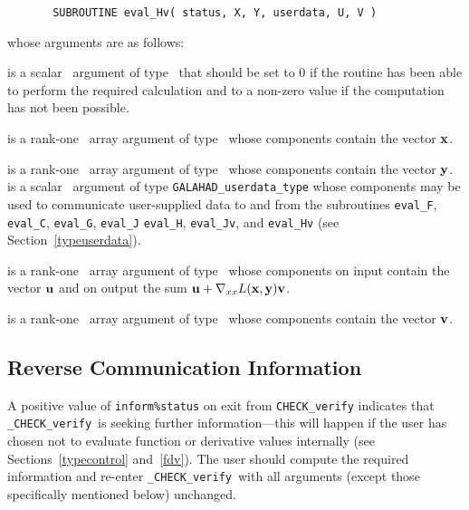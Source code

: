 \documentclass{galahad}
\newcommand{\packagename}{CHECK}
\newcommand{\fullpackagename}{\libraryname\_\packagename}
\newcommand{\solver}{{\tt \fullpackagename\_verify}}
\begin{document}
\def\baselinestretch{0.8}
{\tt \begin{verbatim}
       SUBROUTINE eval_Hv( status, X, Y, userdata, U, V ) \end{verbatim} }
\def\baselinestretch{1.0}
\noindent whose arguments are as follows:

\begin{description}
 is a scalar \intentout\ argument of type \integer\
that should be set to 0 if the routine has been able to perform the
required calculation and to a non-zero value if the computation has not
been possible. 

 is a rank-one \intentin\ array argument of type \realdp\
whose components contain the vector ${\mathbf{x}}$.

 is a rank-one \intentin\ array argument of type \realdp\
whose components contain the vector ${\mathbf{y}}$.
 is a scalar \intentinout\ argument of type 
{\tt GALAHAD\_userdata\_type} whose components may be used
to communicate user-supplied data to and from the
subroutines {\tt eval\_F}, {\tt eval\_C}, {\tt eval\_G}, {\tt eval\_J}
{\tt eval\_H}, {\tt eval\_Jv}, and {\tt eval\_Hv} 
(see Section~\ref{typeuserdata}). 

\ittf{U} is a rank-one \intentinout\ array argument of type \realdp\
whose components on input contain the vector ${\mathbf{u}}$ and on output the
sum ${\mathbf{u}} + \nabla_{xx} L({\mathbf{x}},{\mathbf{y}}) {\mathbf{v}}$.

\ittf{V} is a rank-one \intentin\ array argument of type \realdp\
whose components contain the vector ${\mathbf{v}}$.


\end{description}


\subsection{\label{reverse}Reverse Communication Information}

A positive value of {\tt inform\%status} on exit from 
{\tt \packagename\_verify}
indicates that
\solver\ is seeking further information---this will happen 
if the user has chosen not to evaluate function or 
derivative values internally (see Sections~\ref{typecontrol} and~\ref{fdv}).
The user should compute the required information and re-enter \solver\
with all arguments (except those specifically mentioned below) unchanged.
\end{document}
